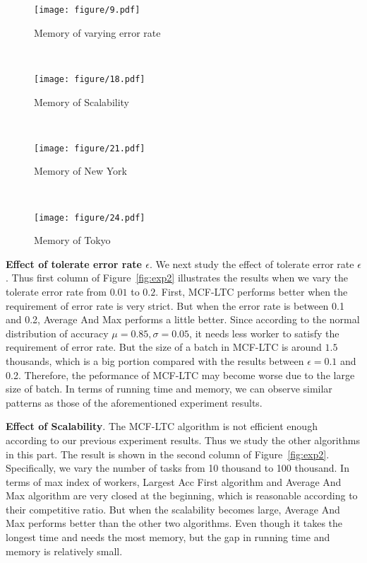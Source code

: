 \begin{figure*}[htb]
	\begin{subfigure}[b]{0.22\textwidth}
		\texttt{[image: figure/9.pdf]}
		\caption{\footnotesize{Memory of varying error rate}}
		\label{fig:card_v_mem}
	\end{subfigure}
	~~
	\begin{subfigure}[b]{0.22\textwidth}
		\texttt{[image: figure/18.pdf]}
		\caption{\footnotesize{Memory of Scalability}}
		\label{fig:card_u_mem}
	\end{subfigure}
	~~
	\begin{subfigure}[b]{0.22\textwidth}
		\texttt{[image: figure/21.pdf]}
		\caption{\footnotesize{Memory of New York}}
		\label{fig:dim_mem}
	\end{subfigure}
	~~
	\begin{subfigure}[b]{0.22\textwidth}
		\texttt{[image: figure/24.pdf]}
		\caption{\footnotesize{Memory of Tokyo}}
		\label{fig:cf_mem}
	\end{subfigure}
	\caption{Results on error rate, scalability and real data set}
	\vspace{-3ex}
	\label{fig:exp2}
\end{figure*}

\textbf{Effect of tolerate error rate $\epsilon$}.
We next study the effect of tolerate error rate $\epsilon$. 
Thus first column of Figure~\ref{fig:exp2} illustrates the results when we vary the tolerate error rate from $0.01$ to $0.2$. 
First, MCF-LTC performs better when the requirement of error rate is very strict.
But when the error rate is between 0.1 and 0.2, Average And Max performs a little better. 
Since according to the normal distribution of accuracy $\mu=0.85,\sigma=0.05$, 
it needs less worker to satisfy the requirement of error rate.
But the size of a batch in MCF-LTC is around $1.5$ thousands, which is a big portion compared with the results between $\epsilon = 0.1$ and 0.2.
Therefore, the peformance of MCF-LTC may become worse due to the large size of batch.
In terms of running time and memory, we can observe similar patterns as those of the aforementioned experiment results.

\textbf{Effect of Scalability}.
The MCF-LTC algorithm is not efficient enough according to our previous experiment results.
Thus we study the other algorithms in this part.
The result is shown in the second column of Figure~\ref{fig:exp2}.
Specifically, we vary the number of tasks from 10 thousand to 100 thousand.
In terms of max index of workers, Largest Acc First algorithm and Average And Max algorithm are very closed
at the beginning, which is reasonable according to their competitive ratio.
But when the scalability becomes large, Average And Max performs better than the other two algorithms.
Even though it takes the longest time and needs the most memory, but the gap in running time and memory is relatively small.

